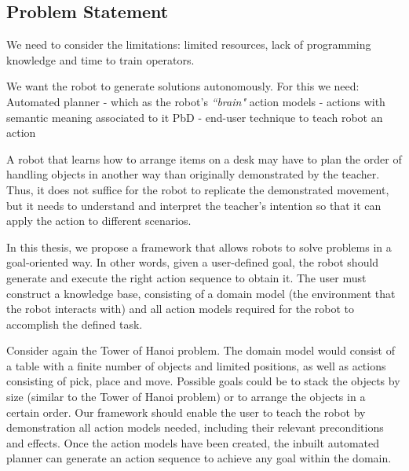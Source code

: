 \subsection{Problem Statement}
We need to consider the limitations: limited resources, lack of programming knowledge and time to train operators.

We want the robot to generate solutions autonomously.
For this we need:
Automated planner - which as the robot's \textit{``brain"}
action models - actions with semantic meaning associated to it
PbD - end-user technique to teach robot an action

A robot that learns how to arrange items on a desk may have to plan the order of handling objects in another way than originally demonstrated by the teacher.
Thus, it does not suffice for the robot to replicate the demonstrated movement, but it needs to understand and interpret the teacher's intention so that it can apply the action to different scenarios.


In this thesis, we propose a framework that allows robots to solve problems in a goal-oriented way.
In other words, given a user-defined goal, the robot should generate and execute the right action sequence to obtain it.
The user must construct a knowledge base, consisting of a domain model (the environment that the robot interacts with) and all action models required for the robot to accomplish the defined task.

Consider again the Tower of Hanoi problem.
The domain model would consist of a table with a finite number of objects and limited positions, as well as actions consisting of pick, place and move. 
Possible goals could be to stack the objects by size (similar to the Tower of Hanoi problem) or to arrange the objects in a certain order. 
Our framework should enable the user to teach the robot by demonstration all action models needed, including their relevant preconditions and effects. 
Once the action models have been created, the inbuilt automated planner can generate an action sequence to achieve any goal within the domain. 


